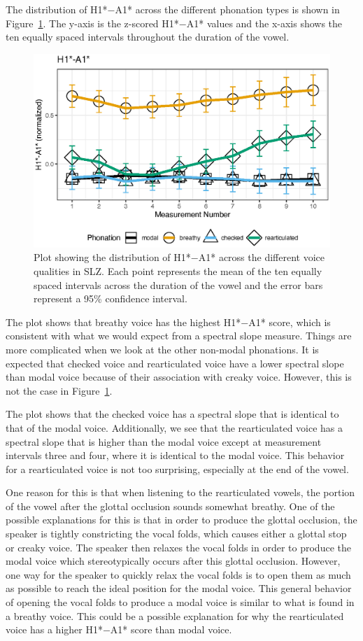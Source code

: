 The distribution of H1*$-$A1* across the different phonation types is shown in Figure~\ref{fig:h1a1}. The y-axis is the z-scored H1*$-$A1* values and the x-axis shows the ten equally spaced intervals throughout the duration of the vowel. 

\begin{figure}[h!]
    \centering
    \includegraphics[width = 0.9\linewidth]{images/h1a1_line.eps}
    \caption{Plot showing the distribution of H1*$-$A1* across the different voice qualities in SLZ. Each point represents the mean of the ten equally spaced intervals across the duration of the vowel and the error bars represent a 95\% confidence interval.}
    \label{fig:h1a1}
\end{figure}

The plot shows that breathy voice has the highest H1*$-$A1* score, which is consistent with what we would expect from a spectral slope measure. Things are more complicated when we look at the other non-modal phonations. It is expected that checked voice and rearticulated voice have a lower spectral slope than modal voice because of their association with creaky voice. However, this is not the case in Figure~\ref{fig:h1a1}. 

The plot shows that the checked voice has a spectral slope that is identical to that of the modal voice. Additionally, we see that the rearticulated voice has a spectral slope that is higher than the modal voice except at measurement intervals three and four, where it is identical to the modal voice. This behavior for a rearticulated voice is not too surprising, especially at the end of the vowel. 

One reason for this is that when listening to the rearticulated vowels, the portion of the vowel after the glottal occlusion sounds somewhat breathy. One of the possible explanations for this is that in order to produce the glottal occlusion, the speaker is tightly constricting the vocal folds, which causes either a glottal stop or creaky voice. The speaker then relaxes the vocal folds in order to produce the modal voice which stereotypically occurs after this glottal occlusion. However, one way for the speaker to quickly relax the vocal folds is to open them as much as possible to reach the ideal position for the modal voice. This general behavior of opening the vocal folds to produce a modal voice is similar to what is found in a breathy voice. This could be a possible explanation for why the rearticulated voice has a higher H1*$-$A1* score than modal voice.

